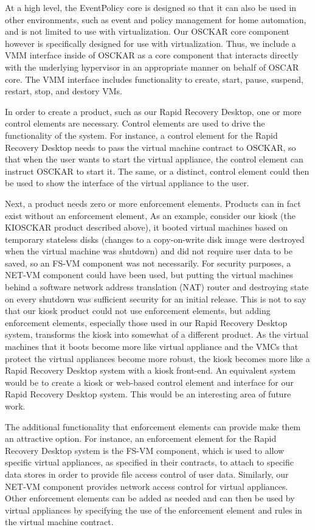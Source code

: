 At a high level, the EventPolicy core is designed so that it can also be used in other environments, such as event and policy management for home automation, and is not limited to use with virtualization. Our OSCKAR core component however is specifically designed for use with virtualization. Thus, we include a VMM interface inside of OSCKAR as a core component that interacts directly with the underlying hypervisor in an appropriate manner on behalf of OSCAR core. The VMM interface includes functionality to create, start, pause, suspend, restart, stop, and destory VMs.

In order to create a product, such as our Rapid Recovery Desktop, one or more control elements are necessary. Control elements are used to drive the functionality of the system. For instance, a control element for the Rapid Recovery Desktop needs to pass the virtual machine contract to OSCKAR, so that when the user wants to start the virtual appliance, the control element can instruct OSCKAR to start it. The same, or a distinct, control element could then be used to show the interface of the virtual appliance to the user.

Next, a product needs zero or more enforcement elements. Products can in fact exist without an enforcement element, As an example, consider our kiosk (the KIOSCKAR product described above), it booted virtual machines based on temporary stateless disks (changes to a copy-on-write disk image were destroyed when the virtual machine was shutdown) and did not require user data to be saved, so an FS-VM component was not necessarily. For security purposes, a NET-VM component could have been used, but putting the virtual machines behind a software network address translation (NAT) router and destroying state on every shutdown was sufficient security for an initial release. This is not to say that our kiosk product could not use enforcement elements, but adding enforcement elements, especially those used in our Rapid Recovery Desktop system, transforms the kiosk into somewhat of a different product. As the virtual machines that it boots become more like virtual appliance and the VMCs that protect the virtual appliances become more robust, the kiosk becomes more like a Rapid Recovery Desktop system with a kiosk front-end. An equivalent system would be to create a kiosk or web-based control element and interface for our Rapid Recovery Desktop system. This would be an interesting area of future work. 

The additional functionality that enforcement elements can provide make them an attractive option. For instance, an enforcement element for the Rapid Recovery Desktop system is the FS-VM component, which is used to allow specific virtual appliances, as specified in their contracts, to attach to specific data stores in order to provide file access control of user data. Similarly, our NET-VM component provides network access control for virtual appliances. Other enforcement elements can be added as needed and can then be used by virtual appliances by specifying the use of the enforcement element and rules in the virtual machine contract.


